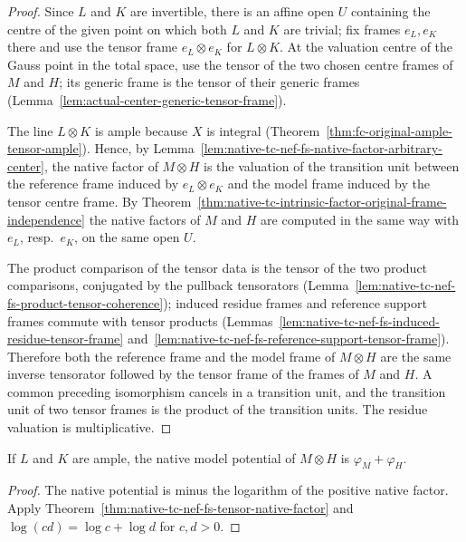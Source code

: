 \begin{proof}
Since $L$ and $K$ are invertible, there is an affine open $U$ containing the centre of the
given point on which both $L$ and $K$ are trivial; fix frames $e_L,e_K$ there and use the
tensor frame $e_L\otimes e_K$ for $L\otimes K$.  At the valuation centre of the Gauss point
in the total space, use the tensor of the two chosen centre frames of $M$ and $H$; its
generic frame is the tensor of their generic frames
(Lemma~\ref{lem:actual-center-generic-tensor-frame}).

The line $L\otimes K$ is ample because $X$ is integral
(Theorem~\ref{thm:fc-original-ample-tensor-ample}).  Hence, by
Lemma~\ref{lem:native-tc-nef-fs-native-factor-arbitrary-center}, the native factor of
$M\otimes H$ is the valuation of the transition unit between the reference frame induced
by $e_L\otimes e_K$ and the model frame induced by the tensor centre frame.  By
Theorem~\ref{thm:native-tc-intrinsic-factor-original-frame-independence} the native factors
of $M$ and $H$ are computed in the same way with $e_L$, resp.\ $e_K$, on the same open $U$.

The product comparison of the tensor data is the tensor of the two product comparisons,
conjugated by the pullback tensorators
(Lemma~\ref{lem:native-tc-nef-fs-product-tensor-coherence}); induced residue frames and
reference support frames commute with tensor products
(Lemmas~\ref{lem:native-tc-nef-fs-induced-residue-tensor-frame}
and~\ref{lem:native-tc-nef-fs-reference-support-tensor-frame}).  Therefore both the
reference frame and the model frame of $M\otimes H$ are the same inverse tensorator
followed by the tensor frame of the frames of $M$ and $H$.  A common preceding isomorphism
cancels in a transition unit, and the transition unit of two tensor frames is the product
of the transition units.  The residue valuation is multiplicative.
\end{proof}

\begin{theorem}
\label{thm:native-tc-nef-fs-tensor-native-potential}
\leanok
{}
If $L$ and $K$ are ample, the native model potential of $M\otimes H$ is
$\varphi_M+\varphi_H$.
\end{theorem}

\begin{proof}
The native potential is minus the logarithm of the positive native factor.  Apply
Theorem~\ref{thm:native-tc-nef-fs-tensor-native-factor} and $\log(cd)=\log c+\log d$ for
$c,d>0$.
\end{proof}

